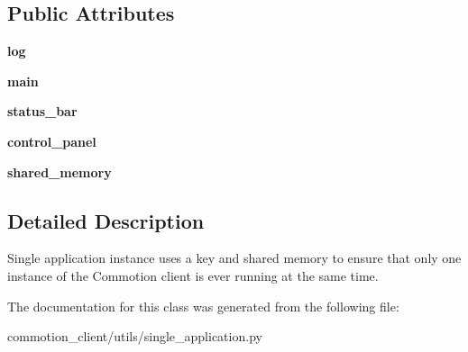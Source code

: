 \subsection*{Public Attributes}
\begin{DoxyCompactItemize}
\item 
\hypertarget{classcommotion__client_1_1utils_1_1single__application_1_1SingleApplication_a0d42a4c04a6fc8df6522699695110c2b}{{\bfseries log}}\label{classcommotion__client_1_1utils_1_1single__application_1_1SingleApplication_a0d42a4c04a6fc8df6522699695110c2b}

\item 
\hypertarget{classcommotion__client_1_1utils_1_1single__application_1_1SingleApplication_a1aceece78c1e408d8d94ed8764f246a4}{{\bfseries main}}\label{classcommotion__client_1_1utils_1_1single__application_1_1SingleApplication_a1aceece78c1e408d8d94ed8764f246a4}

\item 
\hypertarget{classcommotion__client_1_1utils_1_1single__application_1_1SingleApplication_ae4582c8bf029813714440ea61ef77b3d}{{\bfseries status\-\_\-bar}}\label{classcommotion__client_1_1utils_1_1single__application_1_1SingleApplication_ae4582c8bf029813714440ea61ef77b3d}

\item 
\hypertarget{classcommotion__client_1_1utils_1_1single__application_1_1SingleApplication_adbe8eec2bb7d760cb6f39fd03957f8f6}{{\bfseries control\-\_\-panel}}\label{classcommotion__client_1_1utils_1_1single__application_1_1SingleApplication_adbe8eec2bb7d760cb6f39fd03957f8f6}

\item 
\hypertarget{classcommotion__client_1_1utils_1_1single__application_1_1SingleApplication_ae2b4a1243e937e06fef4cf521cc5cca5}{{\bfseries shared\-\_\-memory}}\label{classcommotion__client_1_1utils_1_1single__application_1_1SingleApplication_ae2b4a1243e937e06fef4cf521cc5cca5}

\end{DoxyCompactItemize}


\subsection{Detailed Description}
\begin{DoxyVerb}Single application instance uses a key and shared memory to ensure that only one instance of the Commotion client is ever running at the same time.
\end{DoxyVerb}
 

The documentation for this class was generated from the following file\-:\begin{DoxyCompactItemize}
\item 
commotion\-\_\-client/utils/single\-\_\-application.\-py\end{DoxyCompactItemize}
